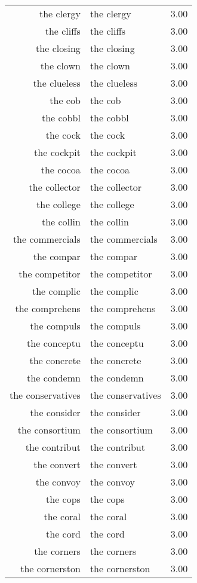 \begin{table}[ht]
\begin{tabular}{rlr}
  the clergy & the clergy & 3.00 \\ 
  the cliffs & the cliffs & 3.00 \\ 
  the closing & the closing & 3.00 \\ 
  the clown & the clown & 3.00 \\ 
  the clueless & the clueless & 3.00 \\ 
  the cob & the cob & 3.00 \\ 
  the cobbl & the cobbl & 3.00 \\ 
  the cock & the cock & 3.00 \\ 
  the cockpit & the cockpit & 3.00 \\ 
  the cocoa & the cocoa & 3.00 \\ 
  the collector & the collector & 3.00 \\ 
  the college & the college & 3.00 \\ 
  the collin & the collin & 3.00 \\ 
  the commercials & the commercials & 3.00 \\ 
  the compar & the compar & 3.00 \\ 
  the competitor & the competitor & 3.00 \\ 
  the complic & the complic & 3.00 \\ 
  the comprehens & the comprehens & 3.00 \\ 
  the compuls & the compuls & 3.00 \\ 
  the conceptu & the conceptu & 3.00 \\ 
  the concrete & the concrete & 3.00 \\ 
  the condemn & the condemn & 3.00 \\ 
  the conservatives & the conservatives & 3.00 \\ 
  the consider & the consider & 3.00 \\ 
  the consortium & the consortium & 3.00 \\ 
  the contribut & the contribut & 3.00 \\ 
  the convert & the convert & 3.00 \\ 
  the convoy & the convoy & 3.00 \\ 
  the cops & the cops & 3.00 \\ 
  the coral & the coral & 3.00 \\ 
  the cord & the cord & 3.00 \\ 
  the corners & the corners & 3.00 \\ 
  the cornerston & the cornerston & 3.00 \\ 

\end{tabular}
\end{table}
